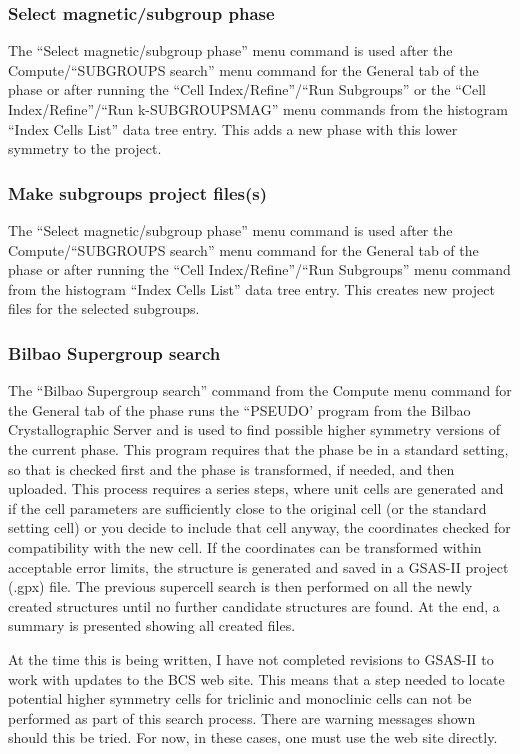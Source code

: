 \subsubsection{Select magnetic/subgroup phase}
The ``Select magnetic/subgroup phase'' menu command is used after the Compute/``SUBGROUPS search'' menu command  for the General tab of the phase or after running the  ``Cell Index/Refine''/``Run Subgroups'' or the  ``Cell Index/Refine''/``Run k-SUBGROUPSMAG''  menu commands from the histogram ``Index Cells List'' data tree entry. This adds a new phase with this lower symmetry to the project.
 
\subsubsection{Make subgroups project files(s)}
The ``Select magnetic/subgroup phase'' menu command is used after the Compute/``SUBGROUPS search'' menu command for the General tab of the phase or after running the  ``Cell Index/Refine''/``Run Subgroups''  menu command from the histogram ``Index Cells List'' data tree entry. This creates new project files for the selected subgroups. 

\subsubsection{Bilbao Supergroup search}

The ``Bilbao Supergroup search''  command from the Compute menu command for the General tab of the phase runs the ``PSEUDO' program from the Bilbao Crystallographic Server and is used to find possible higher symmetry versions of the current phase. This program requires that the phase be in a standard setting, so that is checked first and the phase is transformed, if needed, and then uploaded. This process requires a series steps, where unit cells are generated and if the cell parameters are sufficiently close to the original cell (or the standard setting cell) or you decide to include that cell anyway, the coordinates checked for compatibility with the new cell. If the coordinates can be transformed within acceptable error limits, the structure is generated and saved in a GSAS-II project (.gpx) file. The previous supercell search is then performed on all the newly created structures until no further candidate structures are found. At the end, a summary is presented showing all created files. 

At the time this is being written, I have not completed revisions to GSAS-II to work with updates to the BCS web site. This means that a step needed to locate potential higher symmetry cells for triclinic and monoclinic cells can not be performed as part of this search process. There are warning messages shown should this be tried.  For now, in these cases, one must use the web site directly. 


